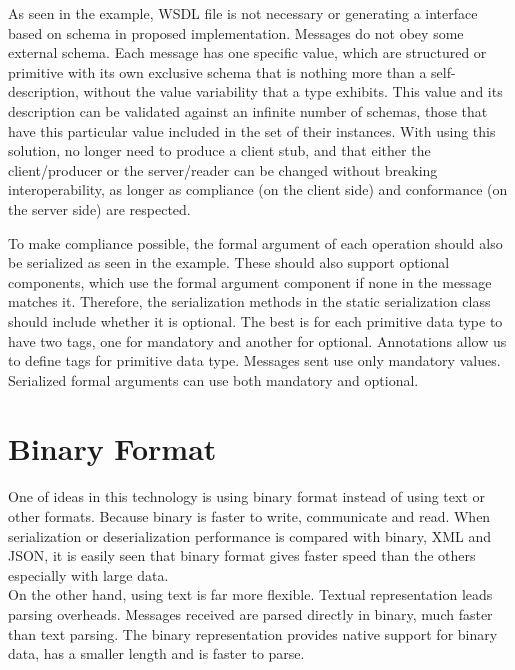 As seen in the example, WSDL file is not necessary or generating a interface based on schema in proposed implementation. Messages do not obey some external schema. Each message has one specific value, which are structured or primitive with its own exclusive schema that is nothing more than a self-description, without the value variability that a type exhibits. This value and its description can be validated against an infinite number of schemas, those that have this particular value included in the set of their instances. With using this solution, no longer need to produce a client stub, and that either the client/producer or the server/reader can be changed without breaking interoperability, as longer as compliance (on the client side) and conformance (on the server side) are respected.

To make compliance possible, the formal argument of each operation should also be serialized as seen in the example. These should also support optional components, which use the formal argument component if none in the message matches it. Therefore, the serialization methods in the static serialization class should include whether it is optional. The best is for each primitive data type to have two tags, one for mandatory and another for optional. Annotations allow us to define tags for primitive data type. Messages sent use only mandatory values. Serialized formal arguments can use both mandatory and optional.

\section{Binary Format}
\label{section:binary}

One of ideas in this technology is using binary format instead of using text or other formats. Because binary is faster to write, communicate and read. When serialization or deserialization performance is compared with binary, XML and JSON, it is easily seen that binary format gives faster speed than the others especially with large data\citep{binary:2016:Online}.\\

On the other hand, using text is far more flexible. Textual representation leads parsing overheads. Messages received are parsed directly in binary, much faster than text parsing. The binary representation provides native support for binary data, has a smaller length and is faster to parse.


